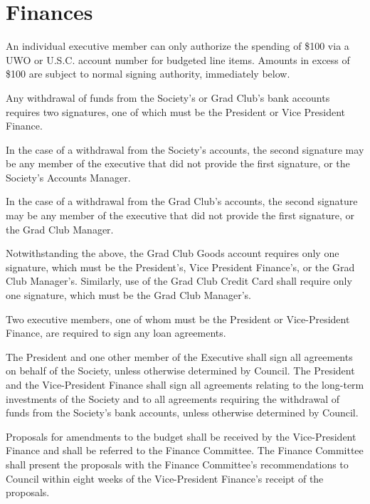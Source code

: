 \section{Finances}
\begin{longenum}[ label*=\thesection.\arabic*., align=left]
	\item An individual executive member can only authorize the spending of \$100 via a  UWO or U.S.C. account number for budgeted line items. Amounts in excess of \$100 are subject to normal signing authority, immediately below.
    \item Any withdrawal of funds from the Society's or Grad Club's bank accounts requires two signatures, one of which must be the President or Vice  President Finance.
    \begin{longenum}[ label*=\arabic*., align=left]
    	\item In the case of a withdrawal from the Society's accounts, the second signature may be any member of the executive that did not provide the first signature, or the Society's Accounts Manager. 
        \item In the case of a withdrawal from the Grad Club's accounts, the second signature may be any member of the executive that did not provide the first signature, or the Grad Club Manager.
    \end{longenum}
    \item Notwithstanding the above, the Grad Club Goods account requires only one signature, which must be the President's, Vice President Finance's, or the Grad Club Manager's. Similarly, use of the Grad Club Credit Card shall require only one signature, which must be the Grad Club Manager's. 
    \item Two executive members, one of whom must be the President or Vice-President Finance, are required to sign any loan agreements.
    \item The President and one other member of the Executive shall sign all agreements on behalf of the Society, unless otherwise determined by Council. The President and the Vice-President Finance shall sign all agreements relating to the long-term investments of the Society and to all agreements requiring the withdrawal of funds from the Society's bank accounts, unless otherwise determined by Council.
    \item Proposals for amendments to the budget shall be received by the Vice-President Finance and shall be referred to the Finance Committee. The Finance Committee shall present the proposals with the Finance Committee's recommendations to Council within eight weeks of the Vice-President Finance's receipt of the proposals.
    

\end{longenum}
